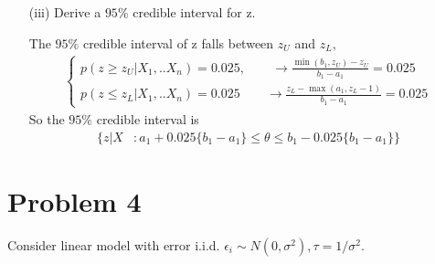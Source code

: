 \begin{itemize}
\item[(iii)] Derive a $95\%$ credible interval for z.

	The $95\%$ credible interval of z falls between $z_U$ and $z_L$, 
\begin{align*}
	\begin{cases*}
		p(z \geq z_{U} |X_1, ..X_n) =  0.025, \qquad \rightarrow \frac{\min(b_1, z_U) -  z_{U} }{b_1- a_1} = 0.025 \\
		p(z \leq z_{L} |X_1, ..X_n)  = 0.025 \qquad  \rightarrow  \frac{z_L- \max(a_1, z_L -1)}{b_1- a_1} = 0.025
	\end{cases*}
\end{align*}	
So the $95\%$ credible interval is 
\begin{align*}
	\Bigg \{ z|X &: a_1 + 0.025 \{b_1 - a_1\} \leq \theta  \leq  b_1- 0.025 \{b_1 - a_1\} \Bigg \}
\end{align*}	

\end{itemize}

\section{Problem 4}
Consider linear model with error i.i.d. $\epsilon_i \sim N(0, \sigma^2), \tau = 1/\sigma^2$.

